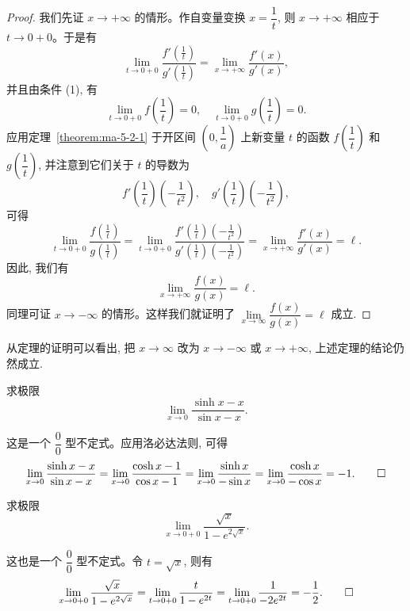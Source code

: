 \begin{proof}
我们先证 $x\to+\infty$ 的情形。作自变量变换 $x=\dfrac1t$, 则 $x\to+\infty$ 相应于 $t\to0+0$。于是有
\[
  \lim_{t\to0+0}
  \frac{f'\left(\frac1t\right)}
       {g'\left(\frac1t\right)}
  =
  \lim_{x\to+\infty}\frac{f'(x)}{g'(x)},
\]
并且由条件 (1), 有
\[
  \lim_{t\to0+0}f\left(\frac1t\right)=0,\quad
  \lim_{t\to0+0}g\left(\frac1t\right)=0.
\]
应用定理~\ref{theorem:ma-5-2-1} 于开区间 $\left(0,\dfrac1a\right)$ 上新变量 $t$ 的函数 $f\left(\dfrac1t\right)$ 和 $g\left(\dfrac1t\right)$, 并注意到它们关于 $t$ 的导数为
\[
  f'\left(\frac1t\right)\left(-\frac1{t^2}\right),\quad
  g'\left(\frac1t\right)\left(-\frac1{t^2}\right),
\]
可得
\[
  \lim_{t\to0+0}
  \frac{f\left(\frac1t\right)}
       {g\left(\frac1t\right)}
  =
  \lim_{t\to0+0}
  \frac{f'\left(\frac1t\right)\left(-\frac1{t^2}\right)}
       {g'\left(\frac1t\right)\left(-\frac1{t^2}\right)}
  =
  \lim_{x\to+\infty}\frac{f'(x)}{g'(x)}
  =
  \ell.
\]
因此, 我们有
\[
  \lim_{x\to+\infty}\frac{f(x)}{g(x)}=\ell.
\]
同理可证 $x\to-\infty$ 的情形。这样我们就证明了 $\lim\limits_{x\to\infty}\dfrac{f(x)}{g(x)}=\ell$ 成立.
\end{proof}


\begin{remark}\label{remark:ma-5-source-37}
从定理的证明可以看出, 把 $x\to\infty$ 改为 $x\to-\infty$ 或 $x\to+\infty$, 上述定理的结论仍然成立.
\end{remark}


\begin{example}\label{example:ma-5-2-1}
求极限
\[
  \lim_{x\to0}\frac{\sinh x-x}{\sin x-x}.
\]
\end{example}


\begin{solve}
这是一个 $\dfrac00$ 型不定式。应用洛必达法则, 可得
\[
  \lim_{x\to0}\frac{\sinh x-x}{\sin x-x}
  =
  \lim_{x\to0}\frac{\cosh x-1}{\cos x-1}
  =
  \lim_{x\to0}\frac{\sinh x}{-\sin x}
  =
  \lim_{x\to0}\frac{\cosh x}{-\cos x}
  =
  -1.
\qedhere
\]
\end{solve}


\begin{example}\label{example:ma-5-2-2}
求极限
\[
  \lim_{x\to0+0}\frac{\sqrt{x}}{1-e^{2\sqrt{x}}}.
\]
\end{example}


\begin{solve}
这也是一个 $\dfrac00$ 型不定式。令 $t=\sqrt{x}$, 则有
\[
  \lim_{x\to0+0}\frac{\sqrt{x}}{1-e^{2\sqrt{x}}}
  =
  \lim_{t\to0+0}\frac{t}{1-e^{2t}}
  =
  \lim_{t\to0+0}\frac1{-2e^{2t}}
  =
  -\frac12.
\qedhere
\]
\end{solve}


